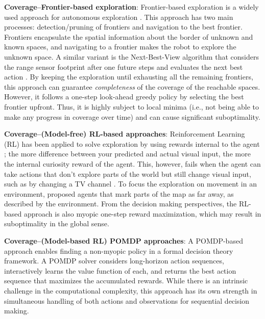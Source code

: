 \documentclass{article}
\newcommand{\ph}[1]{{\textbf{#1}:}} %
\begin{document}
\ph{Coverage--Frontier-based exploration}
Frontier-based exploration is a widely used approach for autonomous exploration \cite{yamauchi1997frontier,tao2007motion,keidar2012robot,heng2015efficient}.
This approach has two main processes: detection/pruning of frontiers and navigation to the best frontier.
Frontiers encapsulate the spatial information about the border of unknown and known spaces, and navigating to a frontier makes the robot to explore the unknown space.
A similar variant is the Next-Best-View algorithm that considers the range sensor footprint after one future steps and evaluates the next best action \cite{gonzalez2002navigation,grabowski2003autonomous}.
%
By keeping the exploration until exhausting all the remaining frontiers, this approach can guarantee \textit{completeness} of the coverage of the reachable spaces.
However, it follows a one-step look-ahead greedy policy by selecting the best frontier upfront.
Thus, it is highly subject to local minima (i.e., not being able to make any progress in coverage over time) and can cause significant suboptimality.



\ph{Coverage--(Model-free) RL-based approaches}
Reinforcement Learning (RL) has been applied to solve exploration by using rewards internal to the agent \cite{pathak_icm, rnd}; the more difference between your predicted and actual visual input, the more the internal curiosity reward of the agent. This, however, fails when the agent can take actions that don't explore parts of the world but still change visual input, such as by changing a TV channel \cite{burda2018study}. To focus the exploration on movement in an environment, \citet{ECR2018} proposed agents that mark parts of the map as far away, as described by the environment.
%
From the decision making perspectives, the RL-based approach is also myopic one-step reward maximization, which may result in suboptimality in the global sense.


\ph{Coverage--(Model-based RL) POMDP approaches}
%
A POMDP-based approach enables finding a non-myopic policy in a formal decision theory framework.
A POMDP solver considers long-horizon action sequences, interactively learns the value function of each, and returns the best action sequence that maximizes the accumulated rewards.
While there is an intrinsic challenge in the computational complexity, this approach has its own strength in simultaneous handling of both actions and observations for sequential decision making.
\end{document}
